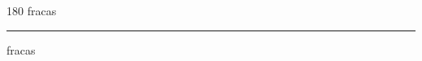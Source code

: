 
\begin{frame}
\begin{center}
\begin{turn}{180}
{\fontsize{2.5cm}{1em}\selectfont fracas}
\end{turn}
\vspace{1em}\par  
\hrule
\vspace{1em}\par  
{\fontsize{2.5cm}{1em}\selectfont fracas}
\end{center}
\end{frame}
